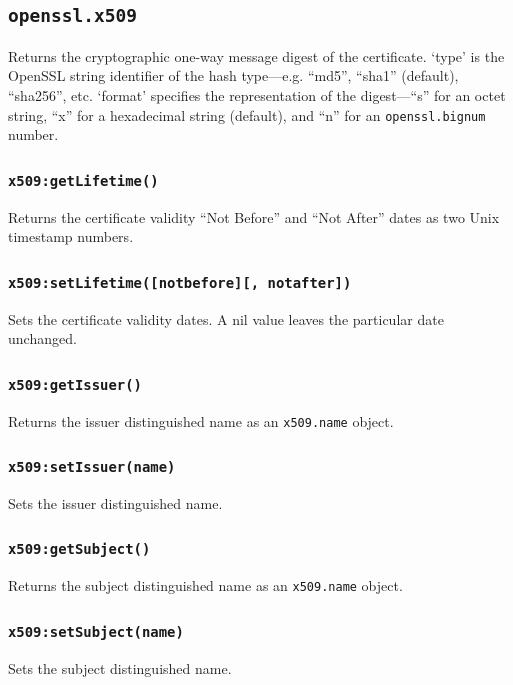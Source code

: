 \documentclass[11pt, oneside]{memoir}
\newcommand*{\fn}[1]{\texttt{#1}\xspace}
\newcommand*{\module}[1]{\texttt{#1}\xspace}
\newcounter{toccols}
\newenvironment{Module}[1]{
	\subsection{\texttt{#1}}
	\addtocontents{toc}{
		\protect\begin{multicols}{\value{toccols}}
	}
}{
	\addtocontents{toc}{\protect\end{multicols}}
}
\begin{document}
\begin{Module}{openssl.x509}
Returns the cryptographic one-way message digest of the certificate. `type' is the OpenSSL string identifier of the hash type---e.g. ``md5'', ``sha1'' (default), ``sha256'', etc. `format' specifies the representation of the digest---``s'' for an octet string, ``x'' for a hexadecimal string (default), and ``n'' for an \module{openssl.bignum} number.

\subsubsection[\fn{x509:getLifetime}]{\fn{x509:getLifetime()}}

Returns the certificate validity ``Not Before'' and ``Not After'' dates as two Unix timestamp numbers.

\subsubsection[\fn{x509:setLifetime}]{\fn{x509:setLifetime([notbefore][, notafter])}}

Sets the certificate validity dates. A nil value leaves the particular date unchanged.

\subsubsection[\fn{x509:getIssuer}]{\fn{x509:getIssuer()}}

Returns the issuer distinguished name as an \module{x509.name} object.

\subsubsection[\fn{x509:setIssuer}]{\fn{x509:setIssuer(name)}}

Sets the issuer distinguished name.

\subsubsection[\fn{x509:getSubject}]{\fn{x509:getSubject()}}

Returns the subject distinguished name as an \module{x509.name} object.

\subsubsection[\fn{x509:setSubject}]{\fn{x509:setSubject(name)}}

Sets the subject distinguished name.


\end{Module}
\end{document}
